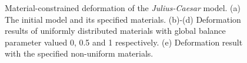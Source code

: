 \begin{figure} [htbp]
{\begin{minipage}[b]{0.23\textwidth}
    \end{minipage}}
  \caption{Material-constrained deformation of the \textit{Julius-Caesar} model. (a) The initial model and its specified materials. (b)-(d) Deformation results of uniformly distributed materials with global balance parameter valued 0, 0.5 and 1 respectively. (e) Deformation result with the specified non-uniform materials.}
  \label{fig:deformJCMat} %
\end{figure}

